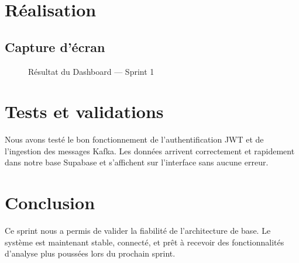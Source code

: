 \section{Réalisation}
\subsection{Capture d'écran}
\begin{figure}[H]
\centering
{}
\caption{Résultat du Dashboard — Sprint 1}
\end{figure}

\section{Tests et validations}
Nous avons testé le bon fonctionnement de l'authentification JWT et de l'ingestion des messages Kafka. Les données arrivent correctement et rapidement dans notre base Supabase et s'affichent sur l'interface sans aucune erreur.

\section{Conclusion}
Ce sprint nous a permis de valider la fiabilité de l'architecture de base. Le système est maintenant stable, connecté, et prêt à recevoir des fonctionnalités d'analyse plus poussées lors du prochain sprint.
